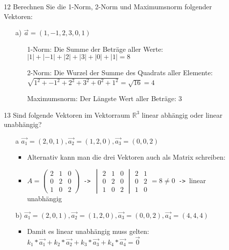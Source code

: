 \documentclass{article}
\newcommand{\R}{\mathbb{R}}
\begin{document}
\begin{itemize}
\begin{itemize}
		\end{itemize}
		\item[12]{Berechnen Sie die 1-Norm, 2-Norm und Maximumsnorm folgender Vektoren:}
		\begin{itemize}
			\item[a)]{$\vec{a}=(1,-1,2,3,0,1)$}
			\begin{itemize}
				\item[1-Norm:]{Die Summe der Beträge aller Werte: $|1|+|-1|+|2|+|3|+|0|+|1|=8$}
				\item[2-Norm:]{Die Wurzel der Summe des Quadrats aller Elemente: $\sqrt{1^2+-1^2+2^2+3^2+0^2+1^2}=\sqrt{16}=4$}
				\item[Maximumsnorm:]{Der Längste Wert aller Beträge: $3$}
			\end{itemize}
		\end{itemize}
		\item[13]{Sind folgende Vektoren im Vektorraum ${\R}^3$ linear abhängig oder linear unabhängig?}
		\begin{itemize}
			\item[a]{$\vec{a_1}=(2,0,1), \vec{a_2}=(1,2,0), \vec{a_3}=(0,0,2)$}
			\begin{itemize}
				\item{Alternativ kann man die drei Vektoren auch als Matrix schreiben:}
				\item{$A=\begin{pmatrix} 2 & 1 & 0 \\ 0 & 2 & 0 \\ 1 & 0 & 2 \end{pmatrix}$\texttt{ -> }$\begin{vmatrix} 2 & 1 & 0 \\ 0 & 2 & 0 \\ 1 & 0 & 2 \end{vmatrix}\begin{matrix} 2 & 1 \\ 0 & 2 \\ 1 & 0 \end{matrix}=8\ne 0$\texttt{ -> }linear unabhängig}
			\end{itemize}
			\item[b)]{$\vec{a_1}=(2,0,1), \vec{a_2}=(1,2,0), \vec{a_3}=(0,0,2), \vec{a_4}=(4,4,4)$}
			\begin{itemize}
				\item{Damit es linear unabhängig muss gelten: $k_1*\vec{a_1}+k_2*\vec{a_2}+k_3*\vec{a_3}+k_4*\vec{a_4}=\vec{0}$}

\end{itemize}
\end{itemize}
\end{itemize}
\end{document}
